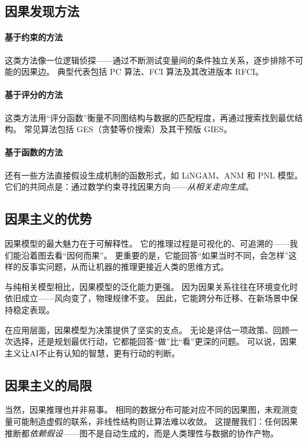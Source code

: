 \subsection{因果发现方法}

\paragraph{基于约束的方法}
这类方法像一位逻辑侦探——通过不断测试变量间的条件独立关系，逐步排除不可能的因果边。  
典型代表包括 PC 算法、FCI 算法及其改进版本 RFCI。

\paragraph{基于评分的方法}
这类方法用“评分函数”衡量不同图结构与数据的匹配程度，再通过搜索找到最优结构。  
常见算法包括 GES（贪婪等价搜索）及其干预版 GIES。

\paragraph{基于函数的方法}
还有一些方法直接假设生成机制的函数形式，如 LiNGAM、ANM 和 PNL 模型。  
它们的共同点是：通过数学约束寻找因果方向——\emph{从相关走向生成}。

\subsection{因果主义的优势}

因果模型的最大魅力在于可解释性。  
它的推理过程是可视化的、可追溯的——我们能沿着图去看“因何而果”。  
更重要的是，它能回答“如果当时不同，会怎样”这样的反事实问题，从而让机器的推理更接近人类的思维方式。

与纯相关模型相比，因果模型的泛化能力更强。  
因为因果关系往往在环境变化时依旧成立——风向变了，物理规律不变。  
因此，它能跨分布迁移、在新场景中保持稳定表现。

在应用层面，因果模型为决策提供了坚实的支点。  
无论是评估一项政策、回顾一次选择，还是规划最优行动，它都能回答“做”比“看”更深的问题。  
可以说，因果主义让AI不止有认知的智慧，更有行动的判断。

\subsection{因果主义的局限}

当然，因果推理也并非易事。  
相同的数据分布可能对应不同的因果图，未观测变量可能制造虚假的联系，非线性结构则让算法难以收敛。  
这提醒我们：任何因果推断都\emph{依赖假设}——图不是自动生成的，而是人类理性与数据的协作产物。

